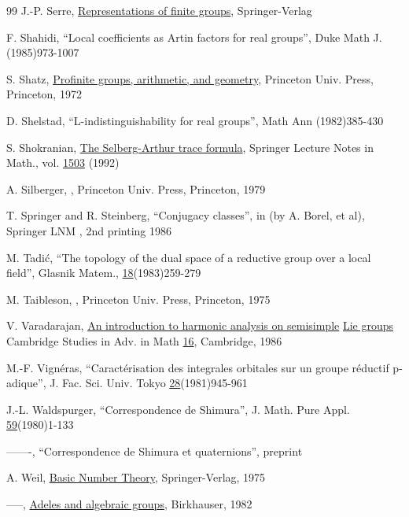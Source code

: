 \begin{thebibliography}{99}
 J.-P. Serre,  \underline{Representations of finite groups},
Springer-Verlag

 F. Shahidi, ``Local coefficients as Artin factors
for real groups'',
Duke Math J. (1985)973-1007

 S. Shatz, \underline{Profinite groups, arithmetic, and 
geometry},
Princeton Univ. Press, Princeton, 1972

 D. Shelstad, ``L-indistinguishability for real groups'', 
Math
Ann (1982)385-430

 S. Shokranian, \underline{The Selberg-Arthur trace formula}, 
Springer Lecture Notes in Math., vol. \underline{1503} (1992)

 A. Silberger,   
    
 , Princeton Univ. Press, Princeton, 1979

 T. Springer and R. Steinberg, ``Conjugacy classes'',
in 
 (by A. Borel, et al),
Springer LNM , 2nd printing 1986

 M. Tadi\'c, ``The topology of the dual space of a 
reductive group over a
local field'', Glasnik Matem., \underline{18}(1983)259-279

 M. Taibleson,   
  , Princeton Univ.
Press, Princeton, 1975

 V. Varadarajan,
\underline{An introduction to harmonic analysis on semisimple}
\underline{Lie groups}
Cambridge Studies in Adv. in Math \underline{16}, Cambridge, 1986

 M.-F. Vign\'eras, ``Caract\'erisation des integrales 
orbitales sur un
groupe r\'eductif p-adique'', J. Fac. Sci. Univ. Tokyo 
\underline{28}(1981)945-961

 J.-L. Waldspurger, ``Correspondence de Shimura'',
J. Math. Pure
Appl. \underline{59}(1980)1-133

 -------, ``Correspondence de Shimura et quaternions'',
preprint

 A. Weil, \underline{Basic Number Theory}, 
Springer-Verlag, 1975

 -----, \underline{Adeles and algebraic groups}, 
Birkhauser, 1982


\end{thebibliography}

